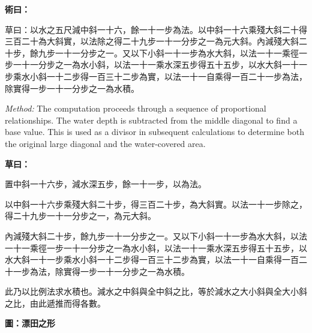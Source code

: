 \documentclass[11pt,a4paper]{article}
\newenvironment{method}{%
  \medskip\noindent{\color{methodcolor}\rule{0.5\textwidth}{0.5pt}}%
  \par\color{methodcolor}%
}{%
  \par\medskip%
}
\newenvironment{calculation}{%
  \medskip\noindent{\color{caocolor}\rule{0.4\textwidth}{0.4pt}}%
  \par\color{caocolor}%
}{%
  \par\medskip%
}
\begin{document}
\begin{method}
\textbf{術曰：}

草曰：以水之五尺減中斜一十六，餘一十一步為法。以中斜一十六乘殘大斜二十得三百二十為大斜實，以法除之得二十九步一十一分步之一為元大斜。內減殘大斜二十步，餘九步一十一分步之一。又以下小斜一十一步為水大斜，以法一十一乘徑一步一十一分步之一為水小斜，以法一十一乘水深五步得五十五步，以水大斜一十一步乘水小斜一十二步得一百三十二步為實，以法一十一自乘得一百二十一步為法，除實得一步一十一分步之一為水積。

\medskip
\textit{Method:} The computation proceeds through a sequence of proportional relationships. The water depth is subtracted from the middle diagonal to find a base value. This is used as a divisor in subsequent calculations to determine both the original large diagonal and the water-covered area.
\end{method}

\begin{calculation}
\textbf{草曰：}

置中斜一十六步，減水深五步，餘一十一步，以為法。

以中斜一十六步乘殘大斜二十步，得三百二十步，為大斜實。以法一十一步除之，得二十九步一十一分步之一，為元大斜。

內減殘大斜二十步，餘九步一十一分步之一。又以下小斜一十一步為水大斜，以法一十一乘徑一步一十一分步之一為水小斜，以法一十一乘水深五步得五十五步，以水大斜一十一步乘水小斜一十二步得一百三十二步為實，以法一十一自乘得一百二十一步為法，除實得一步一十一分步之一為水積。

此乃以比例法求水積也。減水之中斜與全中斜之比，等於減水之大小斜與全大小斜之比，由此遞推而得各數。
\end{calculation}

\noindent\textbf{圖：漂田之形}
\begin{center}
\end{center}

\newpage

\end{document}
